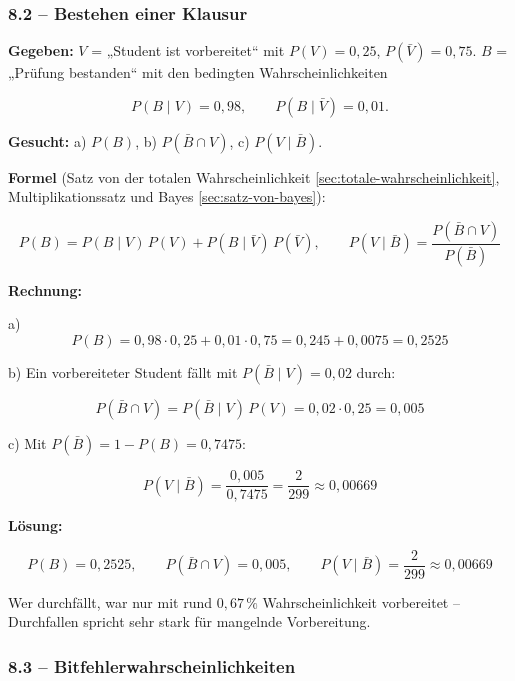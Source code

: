 \subsubsection*{8.2 – Bestehen einer Klausur}

\begin{beispiel}

\textbf{Gegeben:} $V$ = „Student ist vorbereitet`` mit $P(V) = 0{,}25$,
$P(\bar V) = 0{,}75$. $B$ = „Prüfung bestanden`` mit den bedingten
Wahrscheinlichkeiten

$$
P(B \mid V) = 0{,}98, \qquad P(B \mid \bar V) = 0{,}01 .
$$

\textbf{Gesucht:} a) $P(B)$, b) $P(\bar B \cap V)$, c) $P(V \mid \bar B)$.

\textbf{Formel} (Satz von der totalen Wahrscheinlichkeit
\ref{sec:totale-wahrscheinlichkeit}, Multiplikationssatz und Bayes
\ref{sec:satz-von-bayes}):

$$
P(B) = P(B \mid V)\,P(V) + P(B \mid \bar V)\,P(\bar V), \qquad
P(V \mid \bar B) = \frac{P(\bar B \cap V)}{P(\bar B)}
$$

\textbf{Rechnung:}

a)
$$
P(B) = 0{,}98 \cdot 0{,}25 + 0{,}01 \cdot 0{,}75 = 0{,}245 + 0{,}0075 = 0{,}2525
$$

b) Ein vorbereiteter Student fällt mit $P(\bar B \mid V) = 0{,}02$ durch:

$$
P(\bar B \cap V) = P(\bar B \mid V)\, P(V) = 0{,}02 \cdot 0{,}25 = 0{,}005
$$

c) Mit $P(\bar B) = 1 - P(B) = 0{,}7475$:

$$
P(V \mid \bar B) = \frac{0{,}005}{0{,}7475} = \frac{2}{299} \approx 0{,}00669
$$

\textbf{Lösung:}

$$
\boxed{P(B) = 0{,}2525, \qquad P(\bar B \cap V) = 0{,}005, \qquad
P(V \mid \bar B) = \frac{2}{299} \approx 0{,}00669}
$$

Wer durchfällt, war nur mit rund $0{,}67\,\%$ Wahrscheinlichkeit vorbereitet --
Durchfallen spricht sehr stark für mangelnde Vorbereitung.

\end{beispiel}

\subsubsection*{8.3 – Bitfehlerwahrscheinlichkeiten}

